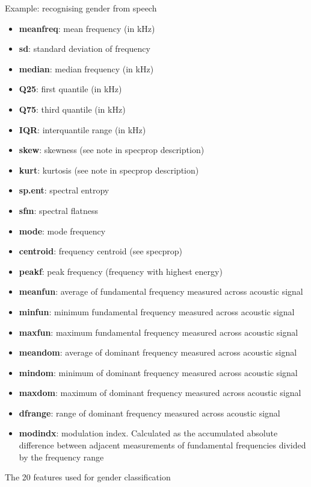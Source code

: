 \documentclass[compress]{beamer}
\begin{document}
\begin{frame}{Example: recognising gender from speech}

\begin{itemize}

\item
  \textbf{meanfreq}: mean frequency (in kHz)
\item
  \textbf{sd}: standard deviation of frequency
\item
  \textbf{median}: median frequency (in kHz)
\item
  \textbf{Q25}: first quantile (in kHz)
\item
  \textbf{Q75}: third quantile (in kHz)
\item
  \textbf{IQR}: interquantile range (in kHz)
\item
  \textbf{skew}: skewness (see note in specprop description)
\item
  \textbf{kurt}: kurtosis (see note in specprop description)
\item
  \textbf{sp.ent}: spectral entropy
\item
  \textbf{sfm}: spectral flatness
\item
  \textbf{mode}: mode frequency
\item
  \textbf{centroid}: frequency centroid (see specprop)
\item
  \textbf{peakf}: peak frequency (frequency with highest energy)
\end{itemize}

\begin{itemize}

\item
  \textbf{meanfun}: average of fundamental frequency measured across
  acoustic signal
\item
  \textbf{minfun}: minimum fundamental frequency measured across
  acoustic signal
\item
  \textbf{maxfun}: maximum fundamental frequency measured across
  acoustic signal
\item
  \textbf{meandom}: average of dominant frequency measured across
  acoustic signal
\item
  \textbf{mindom}: minimum of dominant frequency measured across
  acoustic signal
\item
  \textbf{maxdom}: maximum of dominant frequency measured across
  acoustic signal
\item
  \textbf{dfrange}: range of dominant frequency measured across acoustic
  signal
\item
  \textbf{modindx}: modulation index. Calculated as the accumulated
  absolute difference between adjacent measurements of fundamental
  frequencies divided by the frequency range
\end{itemize}

The 20 features used for gender classification

\end{frame}
\end{document}
